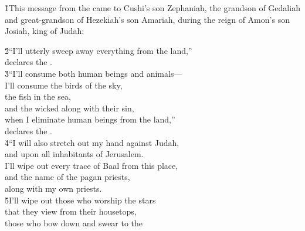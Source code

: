


\v{1}This message from the  came to Cushi's son Zephaniah, the grandson of Gedaliah and great-grandson of Hezekiah's son Amariah, during the reign of Amon's son Josiah, king of Judah:

\begin{poetry}
\poeml \v{2}``I'll utterly sweep away everything from the land,'' \\
\poemll    declares the . \\
\poeml \v{3}``I'll consume both human beings and animals--- \\
\poemll    I'll consume the birds of the sky, \\
\poeml the fish in the sea, \\
\poemll    and the wicked along with their sin, \\
\poeml when I eliminate human beings from the land,'' \\
\poemlll       declares the . \\
\poeml \v{4}``I will also stretch out my hand against Judah, \\
\poemll    and upon all inhabitants of Jerusalem. \\
\poeml I'll wipe out every trace of Baal from this place, \\
\poemll    and the name of the pagan priests, \\
\poemlll       along with my own priests. \\
\poeml \v{5}I'll wipe out those who worship the stars \\
\poemll    that they view from their housetops, \\
\poeml those who bow down and swear to the  \\

\end{poetry}
